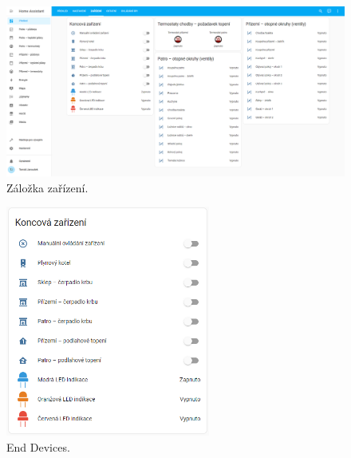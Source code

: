 \begin{Czech}
\begin{figure}[H]
    \centering
    \includegraphics[width=1\textwidth]{pictures/czech/software/devices-tab.png}
    \caption{Záložka zařízení.}
    \label{fig:tab-devices}
\end{figure}
\end{Czech}


\begin{English}
\begin{figure}[H]
    \centering
    \includegraphics[width=0.6\textwidth]{pictures/czech/software/end-devices.png}
    \caption{End Devices.}
    \label{fig:end-devices}
\end{figure}
\end{English}

